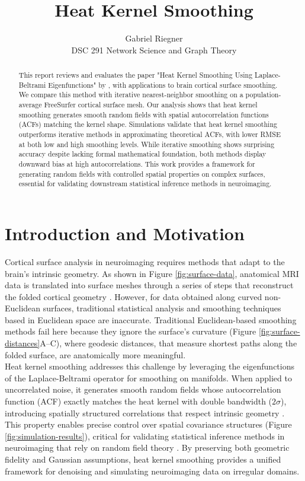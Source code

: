 \documentclass{article}
\title{Heat Kernel Smoothing}
\author{
  Gabriel Riegner\\
  DSC 291 Network Science and Graph Theory
}
\begin{document}
\maketitle

\begin{abstract}
This report reviews and evaluates the paper "Heat Kernel Smoothing Using Laplace-Beltrami Eigenfunctions" by \citet*{seo_heat_2010}, with applications to brain cortical surface smoothing. We compare this method with iterative nearest-neighbor smoothing on a population-average FreeSurfer cortical surface mesh. Our analysis shows that heat kernel smoothing generates smooth random fields with spatial autocorrelation functions (ACFs) matching the kernel shape. Simulations validate that heat kernel smoothing outperforms iterative methods in approximating theoretical ACFs, with lower RMSE at both low and high smoothing levels. While iterative smoothing shows surprising accuracy despite lacking formal mathematical foundation, both methods display downward bias at high autocorrelations. This work provides a framework for generating random fields with controlled spatial properties on complex surfaces, essential for validating downstream statistical inference methods in neuroimaging.
\end{abstract}



\section{Introduction and Motivation}

Cortical surface analysis in neuroimaging requires methods that adapt to the brain’s intrinsic geometry. As shown in Figure \ref{fig:surface-data}, anatomical MRI data is translated into surface meshes through a series of steps that reconstruct the folded cortical geometry \citep{dale_cortical_1999}. However, for data obtained along curved non-Euclidean surfaces, traditional statistical analysis and smoothing techniques based in Euclidean space are inaccurate. Traditional Euclidean-based smoothing methods fail here because they ignore the surface’s curvature (Figure \ref{fig:surface-distances}A–C), where geodesic distances, that measure shortest paths along the folded surface, are anatomically more meaningful.\\

Heat kernel smoothing addresses this challenge by leveraging the eigenfunctions of the Laplace-Beltrami operator for smoothing on manifolds. When applied to uncorrelated noise, it generates smooth random fields whose autocorrelation function (ACF) exactly matches the heat kernel with double bandwidth ($2\sigma$), introducing spatially structured correlations that respect intrinsic geometry \citep{chung_cortical_2005}. This property enables precise control over spatial covariance structures (Figure \ref{fig:simulation-results}), critical for validating statistical inference methods in neuroimaging that rely on random field theory \citep{kushnarev_heat_2019}. By preserving both geometric fidelity and Gaussian assumptions, heat kernel smoothing provides a unified framework for denoising and simulating neuroimaging data on irregular domains.\\
\end{document}
